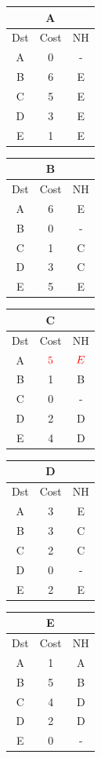 \documentclass[10pt]{article}
\begin{document}
	\begin{table}[h!]
		\begin{tabular}{|c||c||c|}
 			\hline
	 		\multicolumn{3}{|c|}{A} \\
 			\hline
 			Dst & Cost & NH\\
 			\hline
 			A & 0 & - \\
 			B & 6 & E \\
 			C & 5 & E  \\
 			D & 3 & E \\
 			E & 1 & E \\
 			\hline
		\end{tabular}
		\begin{tabular}{|c||c||c|}
 			\hline
	 		\multicolumn{3}{|c|}{B} \\
 			\hline
 			Dst & Cost & NH\\
 			\hline
 			A & 6 & E \\
 			B & 0 & - \\
 			C & 1 & C  \\
 			D & 3 & C \\
 			E & 5 & E \\
 			\hline
		\end{tabular}
		\begin{tabular}{|c||c||c|}
 			\hline
	 		\multicolumn{3}{|c|}{C} \\
 			\hline
 			Dst & Cost & NH\\
 			\hline
 			A & $\color{red} 5$ & $\color{red} E$ \\
 			B & 1 & B \\
 			C & 0 & - \\
 			D & 2 & D \\
 			E & 4 & D \\
 			\hline
		\end{tabular}
		\begin{tabular}{|c||c||c|}
 			\hline
	 		\multicolumn{3}{|c|}{D} \\
 			\hline
 			Dst & Cost & NH\\
 			\hline
 			A & 3 & E \\
 			B & 3 & C \\
 			C & 2 & C \\
 			D & 0 & - \\
 			E & 2 & E \\
 			\hline
		\end{tabular}
		\begin{tabular}{|c||c||c|}
 			\hline
	 		\multicolumn{3}{|c|}{E} \\
 			\hline
 			Dst & Cost & NH\\
 			\hline
 			A & 1 & A \\
 			B & 5 & B \\
 			C & 4 & D  \\
 			D & 2 & D \\
 			E & 0 & - \\
 			\hline
		\end{tabular}
	\end{table}
	
\end{document}
